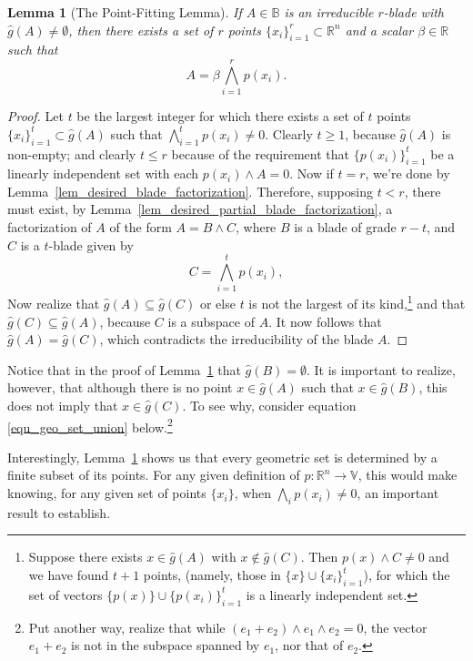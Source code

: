 \documentclass{birkjour}
\newtheorem{lem}[thm]{Lemma}
\theoremstyle{definition}
\theoremstyle{remark}
\numberwithin{equation}{section}
\newcommand{\R}{\mathbb{R}}
\newcommand{\B}{\mathbb{B}}
\newcommand{\V}{\mathbb{V}}
\newcommand{\gh}{\hat{g}}
\begin{document}
\begin{lem}[The Point-Fitting Lemma]\label{lem_factorization_of_irreducible_blades}
If $A\in\B$ is an irreducible $r$-blade with $\gh(A)\neq\emptyset$, then there exists a set of $r$ points $\{x_i\}_{i=1}^r\subset\R^n$
and a scalar $\beta\in\R$ such that
\begin{equation}
A=\beta\bigwedge_{i=1}^r p(x_i).
\end{equation}
\end{lem}
\begin{proof}
Let $t$ be the largest integer for which there exists a set of $t$ points $\{x_i\}_{i=1}^t\subset\gh(A)$ such that
$\bigwedge_{i=1}^t p(x_i)\neq 0$.
Clearly $t\geq 1$, because $\gh(A)$ is non-empty; and clearly $t\leq r$ because of
the requirement that $\{p(x_i)\}_{i=1}^t$ be a linearly independent set with each $p(x_i)\wedge A=0$.  Now if $t=r$, we're
done by Lemma~\ref{lem_desired_blade_factorization}.  Therefore,
supposing $t<r$, there must exist, by Lemma~\ref{lem_desired_partial_blade_factorization}, a factorization of $A$ of the form
$A=B\wedge C$, where $B$ is a blade of grade $r-t$, and $C$ is a $t$-blade given by
\begin{equation}
C=\bigwedge_{i=1}^t p(x_i),
\end{equation}
Now realize that $\gh(A)\subseteq\gh(C)$ or else $t$ is not the largest of its kind,\footnote{Suppose
there exists $x\in\gh(A)$ with $x\not\in\gh(C)$.  Then $p(x)\wedge C\neq 0$ and we have found $t+1$
points, (namely, those in $\{x\}\cup\{x_i\}_{i=1}^t$), for which the set of vectors $\{p(x)\}\cup\{p(x_i)\}_{i=1}^t$ is a linearly independent set.} and
that $\gh(C)\subseteq\gh(A)$, because $C$ is a subspace of $A$.
It now follows that $\gh(A)=\gh(C)$, which contradicts the irreducibility of the blade $A$.
\end{proof}

Notice that in the proof of Lemma~\ref{lem_factorization_of_irreducible_blades} that $\gh(B)=\emptyset$.  It is important to realize, however,
that although there is no point $x\in\gh(A)$ such that $x\in\gh(B)$, this does not imply that $x\in\gh(C)$.
To see why, consider equation \eqref{equ_geo_set_union} below.\footnote{Put another way,
realize that while $(e_1+e_2)\wedge e_1\wedge e_2=0$, the vector $e_1+e_2$ is not in the subspace
spanned by $e_1$, nor that of $e_2$.}

Interestingly, Lemma~\ref{lem_factorization_of_irreducible_blades} shows us that every geometric
set is determined by a finite subset of its points.  For any given definition of $p:\R^n\to\V$, this
would make knowing, for any given set of points $\{x_i\}$, when $\bigwedge_i p(x_i)\neq 0$,
an important result to establish.
\end{document}
